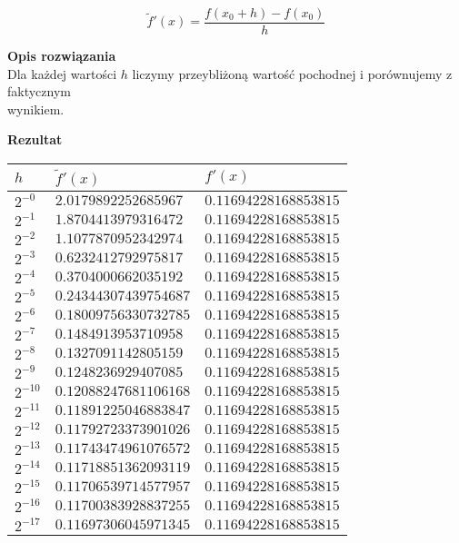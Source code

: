 \documentclass{article}
\begin{document}
\[ \tilde{f}'(x) = \frac{f(x_0 + h) - f(x_0)}{h} \]

\noindent \textbf{Opis rozwiązania} \\
Dla każdej wartości $h$ liczymy przeybliżoną wartość pochodnej i porównujemy z
faktycznym \\ wynikiem.

\noindent \textbf{Rezultat}

\begin{center}
	\begin{tabular}{|l|l|l|}
		\hline
		$h$       & $\tilde{f}'(x)$       & $f'(x)$               \\
		\hline
		$2^{-0}$  & $2.0179892252685967$  & $0.11694228168853815$ \\
		\hline
		$2^{-1}$  & $1.8704413979316472$  & $0.11694228168853815$ \\
		\hline
		$2^{-2}$  & $1.1077870952342974$  & $0.11694228168853815$ \\
		\hline
		$2^{-3}$  & $0.6232412792975817$  & $0.11694228168853815$ \\
		\hline
		$2^{-4}$  & $0.3704000662035192$  & $0.11694228168853815$ \\
		\hline
		$2^{-5}$  & $0.24344307439754687$ & $0.11694228168853815$ \\
		\hline
		$2^{-6}$  & $0.18009756330732785$ & $0.11694228168853815$ \\
		\hline
		$2^{-7}$  & $0.1484913953710958$  & $0.11694228168853815$ \\
		\hline
		$2^{-8}$  & $0.1327091142805159$  & $0.11694228168853815$ \\
		\hline
		$2^{-9}$  & $0.1248236929407085$  & $0.11694228168853815$ \\
		\hline
		$2^{-10}$ & $0.12088247681106168$ & $0.11694228168853815$ \\
		\hline
		$2^{-11}$ & $0.11891225046883847$ & $0.11694228168853815$ \\
		\hline
		$2^{-12}$ & $0.11792723373901026$ & $0.11694228168853815$ \\
		\hline
		$2^{-13}$ & $0.11743474961076572$ & $0.11694228168853815$ \\
		\hline
		$2^{-14}$ & $0.11718851362093119$ & $0.11694228168853815$ \\
		\hline
		$2^{-15}$ & $0.11706539714577957$ & $0.11694228168853815$ \\
		\hline
		$2^{-16}$ & $0.11700383928837255$ & $0.11694228168853815$ \\
		\hline
		$2^{-17}$ & $0.11697306045971345$ & $0.11694228168853815$ \\

\end{tabular}
\end{center}
\end{document}
